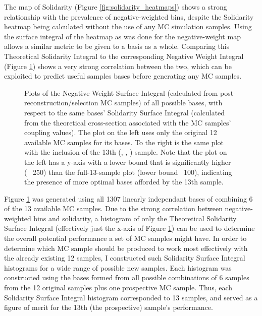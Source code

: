     The map of Solidarity (Figure \ref{fig:solidarity_heatmaps}) shows a strong relationship with the prevalence of negative-weighted bins,
        despite the Solidarity heatmap being calculated without the use of any MC simulation samples.
    Using the surface integral of the heatmap as was done for the negative-weight map allows a similar metric to be given to a basis as a whole.
    Comparing this Theoretical Solidarity Integral to the corresponding Negative Weight Integral (Figure \ref{fig:nWeight_solidarity_scatter})
        shows a very strong correlation between the two,
        which can be exploited to predict useful samples bases before generating any MC samples.

    \begin{figure}[tbh]
        \caption{
            Plots of the Negative Weight Surface Integral (calculated from post-reconstruction/selection MC samples)
                of all possible bases, with respect to the same bases' Solidarity Surface Integral
                (calculated from the theoretical cross-section associated with the MC samples' coupling values).
            The plot on the left uses only the original 12 available MC samples for its bases.
            To the right is the same plot with the inclusion of the 13th (, , ) sample.
            Note that the plot on the left has a y-axis with a lower bound that is significantly higher (~ 250) 
                than the full-13-sample plot (lower bound ~100),
                indicating the presence of more optimal bases afforded by the 13th sample.
        }
        \label{fig:nWeight_solidarity_scatter}
    \end{figure}


    Figure \ref{fig:nWeight_solidarity_scatter} was generated using all 1307 linearly independant bases of combining 6 of the 13 available MC samples.
    Due to the strong correlation between negative-weighted bins and solidarity,
        a histogram of only the Theoretical Solidarity Surface Integral
        (effectively just the x-axis of Figure \ref{fig:nWeight_solidarity_scatter})
        can be used to determine the overall potential performance a set of MC samples might have.
    In order to determine which MC sample should be produced to work most effectively with the already existing 12 samples,
        I constructed such Solidarity Surface Integral histograms for a wide range of possible new samples.
    Each histogram was constructed using the bases formed from all possible combinations of 6 samples from
        the 12 original samples plus one prospective MC sample.
    Thus, each Solidarity Surface Integral histogram corresponded to 13 samples,
        and served as a figure of merit for the 13th (the prospective) sample's performance.

